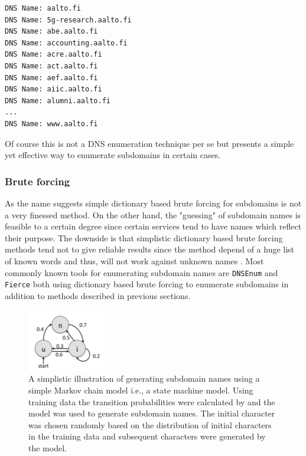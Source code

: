 \begin{verbatim}
DNS Name: aalto.fi
DNS Name: 5g-research.aalto.fi
DNS Name: abe.aalto.fi
DNS Name: accounting.aalto.fi
DNS Name: acre.aalto.fi
DNS Name: act.aalto.fi
DNS Name: aef.aalto.fi
DNS Name: aiic.aalto.fi
DNS Name: alumni.aalto.fi
...
DNS Name: www.aalto.fi
\end{verbatim}

Of course this is not a DNS enumeration technique per se but presents a simple yet effective way to enumerate subdomains in certain cases.

\subsubsection{Brute forcing}

As the name suggests simple dictionary based brute forcing for subdomains is not a very finessed method. On the other hand, the "guessing" of subdomain names is feasible to a certain degree since certain services tend to have names which reflect their purpose. The downside is that simplistic dictionary based brute forcing methods tend not to give reliable results since the method depend of a huge list of known words and
thus, will not work against unknown names \cite{SMART_BRUTE}. Most commonly known tools for enumerating subdomain names are \texttt{DNSEnum} \cite{dnsenum} and \texttt{Fierce} \cite{fierce} both using dictionary based brute forcing to enumerate subdomains in addition to methods described in previous sections.

\begin{figure}[h]
  \begin{center}
    \includegraphics[width=0.3\textwidth]{markov.png}
    \caption{A simplistic illustration of generating subdomain names using a simple Markov chain model i.e., a state machine model. Using training data the transition probabilities were calculated by \citet{SMART_BRUTE} and the model was used to generate subdomain names. The initial character was chosen randomly based on the distribution of initial characters in the training data and subsequent characters were generated by the model.} 
    \label{fig:markov}
  \end{center}
\end{figure}

